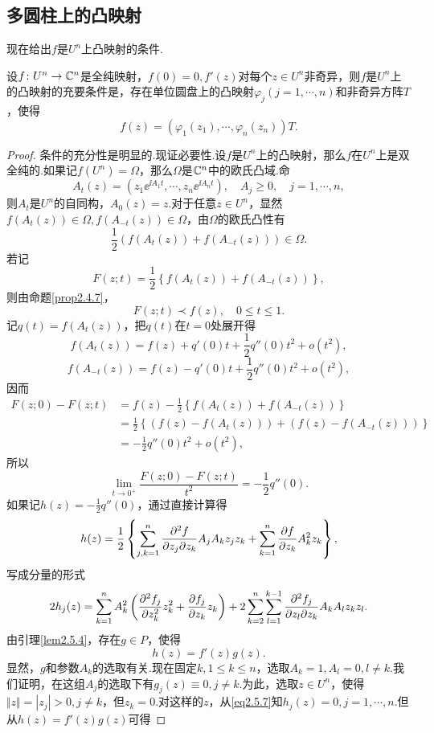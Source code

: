 \subsection{多圆柱上的凸映射}
现在给出$f$是$U^n$上凸映射的条件.
\begin{theorem}\label{thm2.5.7}
	设$f\colon U^n\to\mathbb C^n$是全纯映射，$f(0)=0,f'(z)$对每个$z\in U^n$非奇异，则$f$是$U^n$上的凸映射的充要条件是，存在单位圆盘上的凸映射$\varphi_j(j=1,\cdots,n)$和非奇异方阵$T$，使得
	\begin{equation}\label{eq2.5.6}
		f(z)=(\varphi_1(z_1),\cdots,\varphi_n(z_n))T.
	\end{equation}
\end{theorem}
\begin{proof}
	条件的充分性是明显的.现证必要性.设$f$是$U^n$上的凸映射，那么$f$在$U^n$上是双全纯的.如果记$f(U^n)=\Omega$，那么$\Omega$是$\mathbb C^n$中的欧氏凸域.命
	\[A_t(z)=(z_1\ee^{\ii A_1 t},\cdots, z_n\ee^{\ii A_n t}),\quad A_j\ge0,\quad j=1,\cdots,n,\]
	则$A_t$是$U^n$的自同构，$A_0(z)=z$.对于任意$z\in U^n$，显然$f(A_t(z))\in\Omega,f(A_{-t}(z))\in\Omega$，由$\Omega$的欧氏凸性有
	\[\frac12(f(A_t(z))+f(A_{-t}(z)))\in\Omega.\]
	若记
	\[F(z;t)=\frac12\left\{f(A_t(z))+f(A_{-t}(z))\right\},\]
	则由命题\ref{prop2.4.7}，
	\[F(z;t)\prec f(z),\quad 0\le t\le 1.\]
	记$q(t)=f(A_t(z))$，把$q(t)$在$t=0$处展开得
	\[f(A_t(z))=f(z)+q'(0)t+\frac12 q''(0)t^2+o(t^2),\]
	\[f(A_{-t}(z))=f(z)-q'(0)t+\frac12 q''(0)t^2+o(t^2),\]
	因而
	\begin{align*}
		F(z;0)-F(z;t)
		&=f(z)-\frac12\left\{f(A_t(z))+f(A_{-t}(z))\right\}\\
		&=\frac12\left\{(f(z)-f(A_t(z)))+(f(z)-f(A_{-t}(z)))\right\}\\
		&=-\frac12 q''(0)t^2+o(t^2),
	\end{align*}
所以
\[\lim_{t\to0^+}\frac{F(z;0)-F(z;t)}{t^2}=-\frac12 q''(0).\]
如果记$h(z)=-\frac12 q''(0)$，通过直接计算得
\[h(z)=\frac12\left\{\sum_{j,k=1}^{n}\frac{\partial^2 f}{\partial z_j\partial z_k} A_jA_k z_jz_k +\sum_{k=1}^{n}\frac{\partial f}{\partial z_k} A_k^2 z_k\right\},\]
写成分量的形式
\begin{equation}\label{eq2.5.7}
	2h_j(z)=\sum_{k=1}^{n}A_k^2\left(\frac{\partial^2 f_j}{\partial z_k^2}z_k^2+\frac{\partial f_j}{\partial z_k}z_k\right)+2\sum_{k=2}^{n}\sum_{l=1}^{k-1} \frac{\partial^2 f_j}{\partial z_l\partial z_k}A_k A_l z_k z_l.
\end{equation}
由引理\ref{lem2.5.4}，存在$g\in P$，使得
\begin{equation}\label{eq2.5.8}
	h(z)=f'(z)g(z).
\end{equation}
显然，$g$和参数$A_k$的选取有关.现在固定$k,1\le k\le n$，选取$A_k=1,A_l=0,l\neq k$.我们证明，在这组$A_j$的选取下有$g_j(z)\equiv0,j\neq k$.为此，选取$z\in U^n$，使得$\Vert z\Vert=|z_j|>0,j\neq k$，但$z_k=0$.对这样的$z$，从\eqref{eq2.5.7}知$h_j(z)=0,j=1,\cdots,n$.但从$h(z)=f'(z)g(z)$可得

\end{proof}
